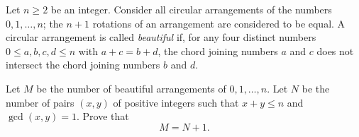 Let $n \geq 2$ be an integer. Consider all circular arrangements of the numbers $0, 1, \ldots, n$; the $n+1$ rotations of an arrangement are considered to be equal. A circular arrangement is called \emph{beautiful} if, for any four distinct numbers $0 \leq a, b, c, d \leq n$ with $a + c = b + d$, the chord joining numbers $a$ and $c$ does not intersect the chord joining numbers $b$ and $d$.

Let $M$ be the number of beautiful arrangements of $0, 1, \ldots, n$. Let $N$ be the number of pairs $(x, y)$ of positive integers such that $x + y \leq n$ and $\gcd(x, y) = 1$. Prove that
\[ M = N + 1. \]
